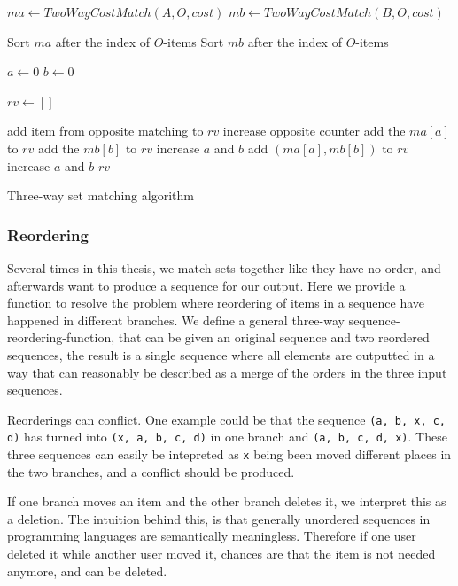 \documentclass[11pt]{article}
\begin{document}
\begin{algorithm}
\begin{algorithmic}
	\State $ma\gets TwoWayCostMatch(A, O, cost)$
	\State $mb\gets TwoWayCostMatch(B, O, cost)$
	
	\State Sort $ma$ after the index of $O$-items
	\State Sort $mb$ after the index of $O$-items

	\State $a \gets 0$
	\State $b \gets 0$
	
	\State $rv \gets []$
	
			\State add item from opposite matching to $rv$
			\State increase opposite counter
			\State add the $ma[a]$ to $rv$
			\State add the $mb[b]$ to $rv$
			\State increase $a$ and $b$
		\Else
			\State add $(ma[a], mb[b])$ to $rv$
			\State increase $a$ and $b$
		\EndIf
	\EndWhile
	\State \Return $rv$
\EndFunction
\end{algorithmic}
\caption{Three-way set matching algorithm}
  \label{ThreeWayCostMatchingAlgorithm}
\end{algorithm}

\subsubsection{Reordering}
\label{ThreeWayReorderingAlgorithmSec}
Several times in this thesis, we match sets together like they have no order, and afterwards want to produce a sequence for our output. Here we provide a function to resolve the problem where reordering of items in a sequence have happened in different branches. We define a general three-way sequence-reordering-function, that can be given an original sequence and two reordered sequences, the result is a single sequence where all elements are outputted in a way that can reasonably be described as a merge of the orders in the three input sequences.

Reorderings can conflict. One example could be that the sequence \texttt{(a, b, x, c, d)} has turned into \texttt{(x, a, b, c, d)} in one branch and \texttt{(a, b, c, d, x)}. These three sequences can easily be intepreted as \texttt{x} being been moved different places in the two branches, and a conflict should be produced.

If one branch moves an item and the other branch deletes it, we interpret this as a deletion. The intuition behind this, is that generally unordered sequences in programming languages are semantically meaningless. Therefore if one user deleted it while another user moved it, chances are that the item is not needed anymore, and can be deleted.
\end{document}
